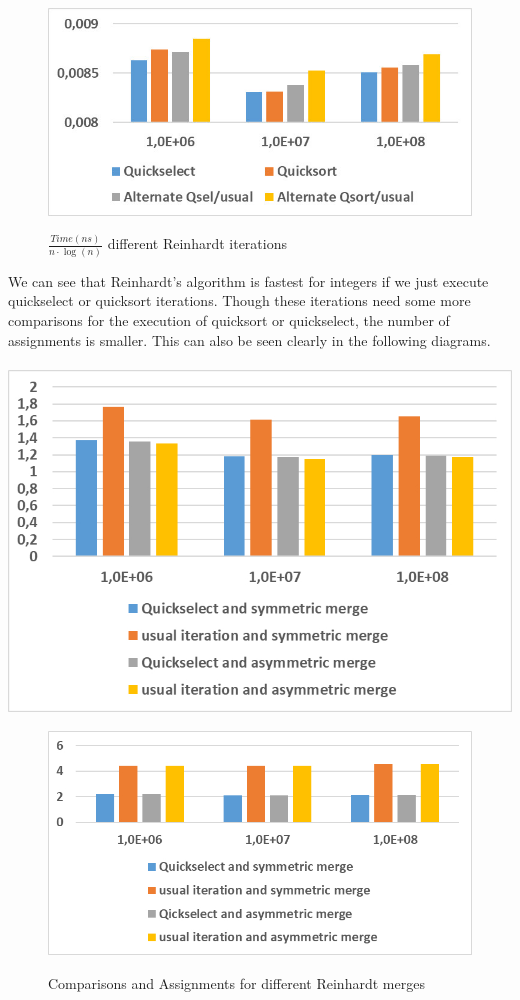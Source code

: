 \documentclass[11pt,pdftex,a4paper, twocolumn]{article}
\begin{document}
\begin{figure}[H]
\includegraphics[width=\linewidth]{Diagramm-Bilder/diff-iterations-time.JPG} \\
\caption{ $ \frac{Time(ns)}{n \cdot \log(n)} $ different Reinhardt iterations } \label{fig:diff-iterations-time}
\end{figure}
We can see that Reinhardt’s algorithm is fastest for integers if we just execute quickselect or quicksort iterations. Though these iterations need some more comparisons for the execution of quicksort or quickselect, the number of assignments is smaller. This can also be seen clearly in the following diagrams. \\
$ $ \\
\includegraphics[width=\linewidth]{Diagramm-Bilder/diff-iterationsAndMerges-comparisons.JPG}
\begin{figure}[H]
\includegraphics[width=\linewidth]{Diagramm-Bilder/diff-iterationsAndMerges-assignments.JPG} \\
\caption{Comparisons and Assignments for different Reinhardt merges} \label{fig:diff-iterationsAndMerges-assignAndComp}
\end{figure}
\end{document}
